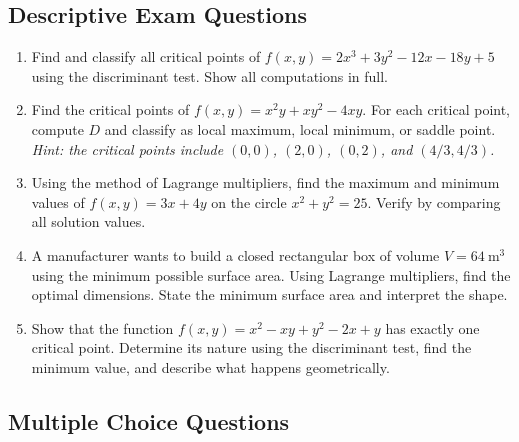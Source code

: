 \documentclass[12pt,a4paper]{article}
\begin{document}
\subsection*{Descriptive Exam Questions}

\begin{enumerate}

  \item Find and classify all critical points of $f(x,y) = 2x^{3} + 3y^{2} - 12x - 18y + 5$ using the discriminant test. Show all computations in full.

  \item Find the critical points of $f(x,y) = x^{2}y + xy^{2} - 4xy$. For each critical point, compute $D$ and classify as local maximum, local minimum, or saddle point. \textit{Hint: the critical points include $(0,0)$, $(2,0)$, $(0,2)$, and $(4/3, 4/3)$.}

  \item Using the method of Lagrange multipliers, find the maximum and minimum values of $f(x,y) = 3x + 4y$ on the circle $x^{2} + y^{2} = 25$. Verify by comparing all solution values.

  \item A manufacturer wants to build a closed rectangular box of volume $V = 64\ \mathrm{m}^{3}$ using the minimum possible surface area. Using Lagrange multipliers, find the optimal dimensions. State the minimum surface area and interpret the shape.

  \item Show that the function $f(x,y) = x^{2} - xy + y^{2} - 2x + y$ has exactly one critical point. Determine its nature using the discriminant test, find the minimum value, and describe what happens geometrically.

\end{enumerate}

\subsection*{Multiple Choice Questions}
\end{document}
